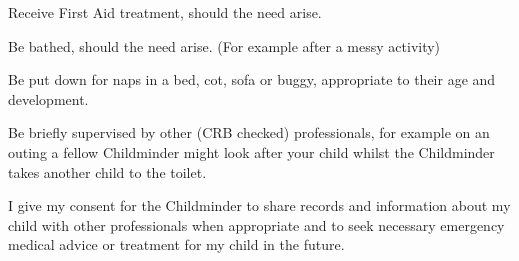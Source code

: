 \documentclass[10pt]{article}
\begin{document}
Receive First Aid treatment, should the need arise.

\sigtable

Be bathed, should the need arise.  (For example after a messy activity)

\sigtable

Be put down for naps in a bed, cot, sofa or buggy, appropriate to their age and development.

\sigtable

Be briefly supervised by other (CRB checked) professionals, for example on an outing a fellow Childminder might look after your child whilst the Childminder takes another child to the toilet.

\sigtable

I give my consent for the Childminder to share records and information about my child with other professionals when appropriate and to seek necessary emergency medical advice or treatment for my child in the future.

\sigtable


\end{document}
